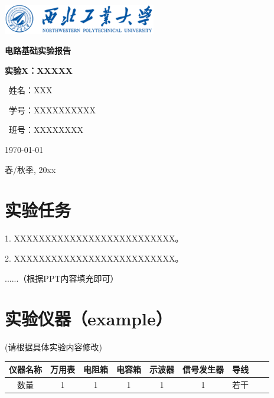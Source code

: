 \documentclass[UTF8]{ctexart}
\begin{document}
\begin{titlepage}
    \centering
    \includegraphics[width=0.5\textwidth]{logo2.png}\par\vspace{1cm}

    \vspace{1.5cm}
    {\Huge\bfseries 电路基础实验报告\par}    
    \vspace{0.5cm}
    {\huge\bfseries 实验X：XXXXX\par}
    \vspace{4cm}
    {\Large\ 姓名：XXX\par}
    \vspace{0.5cm}
    {\Large\ 学号：XXXXXXXXXX\par}
    \vspace{0.5cm}
    {\Large\ 班号：XXXXXXXX\par}
    \vfill
    {\large \today\par}
    {\large 春/秋季, 20xx\par}
\end{titlepage}

\fancyfoot[C]{\thepage}

\newpage
\begin{center}
\vspace*{\hfill}
\tableofcontents
\vspace*{\hfill}
\end{center}

\newpage
\vspace{1em}
\section{实验任务}
1. XXXXXXXXXXXXXXXXXXXXXXXXXX。

2. XXXXXXXXXXXXXXXXXXXXXXXXXX。

......（根据PPT内容填充即可）
\vspace{2em}
\section{实验仪器（example）}
(请根据具体实验内容修改)\\
\vspace{1em}
\begin{center}
\begin{tabular}{|c|c|c|c|c|c|c|c|c|}
 \hline
仪器名称 & 万用表 & 电阻箱 & 电容箱 & 示波器 & 信号发生器 & 导线\\
 \hline
数量 & 1 & 1 & 1 & 1 & 1 & 若干\\
 \hline
\end{tabular}
\end{center}
\end{document}
